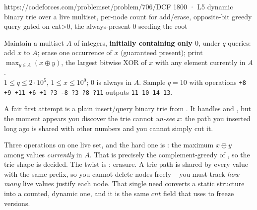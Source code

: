   {https://codeforces.com/problemset/problem/706/D}{CF 1800 · L5}
  {dynamic binary trie over a live multiset, per-node count for add/erase, opposite-bit greedy query gated on cnt>0, the always-present 0 seeding the root}

\begin{problemstatement}
Maintain a multiset $A$ of integers, \textbf{initially containing only $0$}, under $q$ queries:
 add $x$ to $A$;  erase one occurrence of $x$ (guaranteed present);  print
$\max_{y \in A} (x \oplus y)$, the largest bitwise XOR of $x$ with any element currently in $A$.\\
$1 \le q \le 2\cdot10^{5}$, $1 \le x \le 10^{9}$; $0$ is always in $A$. Sample $q=10$ with operations
\texttt{+8 +9 +11 +6 +1 ?3 -8 ?3 ?8 ?11} outputs \texttt{11 10 14 13}.
\end{problemstatement}

\begin{attemptgate}
A fair first attempt is a plain insert/query binary trie from . It handles \code{+} and
, but the moment  appears you discover the trie cannot \emph{un-see} $x$: the path you
inserted long ago is shared with other numbers and you cannot simply cut it.
\end{attemptgate}

Three operations on one live set, and the hard one is : the maximum $x \oplus y$ among values
\emph{currently} in $A$. That is precisely the complement-greedy of , so the trie shape
is decided. The twist is : erasure. A trie path is shared by every value with the same prefix, so
you cannot delete nodes freely -- you must track \emph{how many} live values justify each node. That single
need converts a static structure into a counted, dynamic one, and it is the same $\mathit{cnt}$ field that
 uses to freeze versions.


